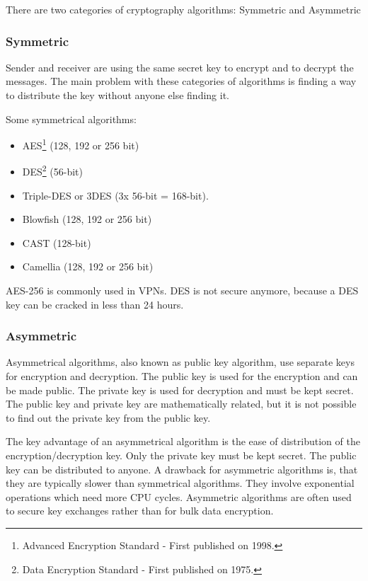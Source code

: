 \documentclass[a4paper]{report}
\begin{document}
There are two categories of cryptography algorithms: Symmetric and Asymmetric

\subsubsection{Symmetric}
\label{sssec:symmetric}
Sender and receiver are using the same secret key to encrypt and to decrypt the messages. The main problem with these categories of algorithms is finding a way to distribute the key without anyone else finding it.

Some symmetrical algorithms:
\begin{itemize}
	\item AES\footnote{Advanced Encryption Standard - First published on 1998.} (128, 192 or 256 bit)
	\item DES\footnote{Data Encryption Standard - First published on 1975.} (56-bit)
	\item Triple-DES or 3DES (3x 56-bit = 168-bit).
	\item Blowfish (128, 192 or 256 bit)
	\item CAST (128-bit)
	\item Camellia (128, 192 or 256 bit)
\end{itemize}
AES-256 is commonly used in VPNs. DES is not secure anymore, because a DES key can be cracked in less than 24 hours. \parencite{Bollapragada2005}

\subsubsection{Asymmetric}
\label{sssec:asymmetric}
Asymmetrical algorithms, also known as public key algorithm, use separate keys for encryption and decryption. The public key is used for the encryption and can be made public. The private key is used for decryption and must be kept secret. The public key and private key are mathematically related, but it is not possible to find out the private key from the public key. 

The key advantage of an asymmetrical algorithm is the ease of distribution of the encryption/decryption key. Only the private key must be kept secret. The public key can be distributed to anyone.
A drawback for asymmetric algorithms is, that they are typically slower than symmetrical algorithms. They involve exponential operations which need more CPU cycles. Asymmetric algorithms are often used to secure key exchanges rather than for bulk data encryption.
\end{document}
